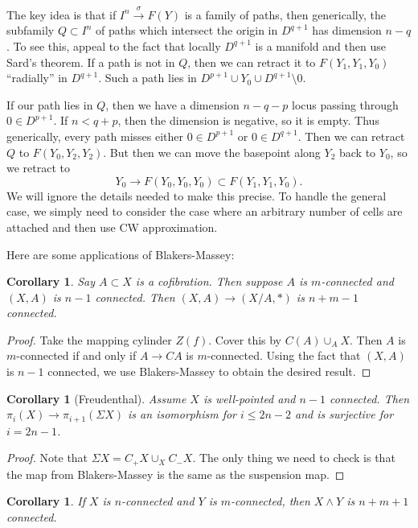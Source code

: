 \documentclass[leqno, openany]{memoir}
\newtheorem{cor}[thm]{Corollary}
\theoremstyle{definition}
\theoremstyle{remark}
\theoremstyle{plain}
\theoremstyle{definition}
\theoremstyle{remark}
\begin{document}
The key idea is that if $I^n \xrightarrow{\sigma} F(Y)$ is a family of paths, then generically, the subfamily $Q \subset  I^n$ of paths which intersect the origin in $D^{q+1}$ has dimension $n-q$. To see this, appeal to the fact that locally $D^{q+1}$ is a manifold and then use Sard's theorem. If a path is not in $Q$, then we can retract it to $F(Y_1, Y_1, Y_0)$ ``radially'' in $D^{q+1}$. Such a path lies in $D^{p+1} \cup Y_0 \cup D^{q+1} \setminus 0$.

If our path lies in $Q$, then we have a dimension $n-q-p$ locus passing through $0 \in D^{p+1}$. If $n < q+p$, then the dimension is negative, so it is empty. Thus generically, every path misses either $0 \in D^{p+1}$ or $0 \in D^{q+1}$. Then we can retract $Q$ to $F(Y_0, Y_2, Y_2)$. But then we can move the basepoint along $Y_2$ back to $Y_0$, so we retract to
\[ Y_0 \to F(Y_0, Y_0, Y_0) \subset F(Y_1, Y_1, Y_0). \]
We will ignore the details needed to make this precise. To handle the general case, we simply need to consider the case where an arbitrary number of cells are attached and then use CW approximation.

Here are some applications of Blakers-Massey:
\begin{cor}
    Say $A \subset X$ is a cofibration. Then suppose $A$ is $m$-connected and $(X,A)$ is $n-1$ connected. Then $(X,A) \to (X/A, *)$ is $n+m-1$ connected.
\end{cor}

\begin{proof}
    Take the mapping cylinder $Z(f)$. Cover this by $C(A) \cup_A X$. Then $A$ is $m$-connected if and only if $A \to CA$ is $m$-connected. Using the fact that $(X,A)$ is $n-1$ connected, we use Blakers-Massey to obtain the desired result.
\end{proof}

\begin{cor}[Freudenthal]
    Assume $X$ is well-pointed and $n-1$ connected. Then $\pi_i(X) \to \pi_{i+1}(\Sigma X)$ is an isomorphism for $i \leq 2n-2$ and is surjective for $i = 2n-1$.
\end{cor}

\begin{proof}
    Note that $\Sigma X = C_+X \cup_X C_-X$. The only thing we need to check is that the map from Blakers-Massey is the same as the suspension map.
\end{proof}

\begin{cor}
    If $X$ is $n$-connected and $Y$ is $m$-connected, then $X \wedge Y$ is $n+m+1$ connected.
\end{cor}
\end{document}
